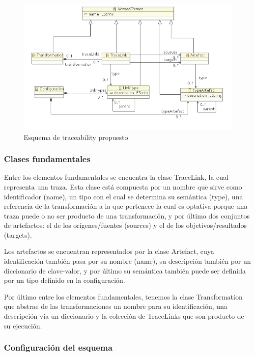 \documentclass[a4paper,12pt,oneside]{book}
\begin{document}
\begin{figure}[hbtp]
\centering
\includegraphics[scale=0.75]{./img/Esquema}
\caption{Esquema de traceability propuesto}
\label{fig:EsquenaPropuesto}
\end{figure}


\subsubsection{Clases fundamentales}

Entre los elementos fundamentales se encuentra la clase TraceLink, la cual representa una traza. Esta clase está compuesta por un nombre que sirve como identificador (name), un tipo con el cual se determina su semántica (type), una referencia de la transformación a la que pertenece la cual es optativa porque una traza puede o no ser producto de una transformación, y por último dos conjuntos de artefactos: el de los orígenes/fuentes (sources) y el de los objetivos/resultados (targets). 

Los artefactos se encuentran representados por la clase Artefact, cuya identificación también pasa por su nombre (name), su descripción también por un diccionario de clave-valor, y por último su semántica también puede ser definida por un tipo definido en la configuración.

Por último entre los elementos fundamentales, tenemos la clase Transformation que abstrae de las transformaciones un nombre para su identificación, una descripción vía un diccionario y la colección de TraceLinks que son producto de su ejecución.


\subsubsection{Configuración del esquema}
\end{document}
